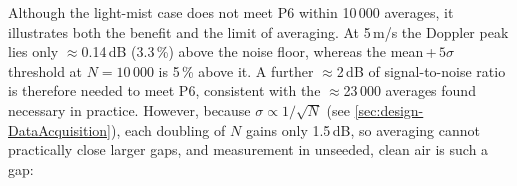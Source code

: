 
Although the light-mist case does not meet P6 within 10\,000 averages, it
illustrates both the benefit and the limit of averaging. At 5\,m/s the Doppler
peak lies only $\approx$0.14\,dB (3.3\,\%) above the noise floor, whereas the
mean\,+\,$5\sigma$ threshold at $N = 10\,000$ is 5\,\% above it. A further $\approx$2\,dB of
signal-to-noise ratio is therefore needed to meet P6, consistent with the
$\approx$23\,000 averages found necessary in practice. However, because
$\sigma \propto 1/\sqrt{N}$ (see \autoref{sec:design-DataAcquisition}), each doubling of $N$ gains only 1.5\,dB, so
averaging cannot practically close larger gaps, and measurement in unseeded, clean air is such a gap:

